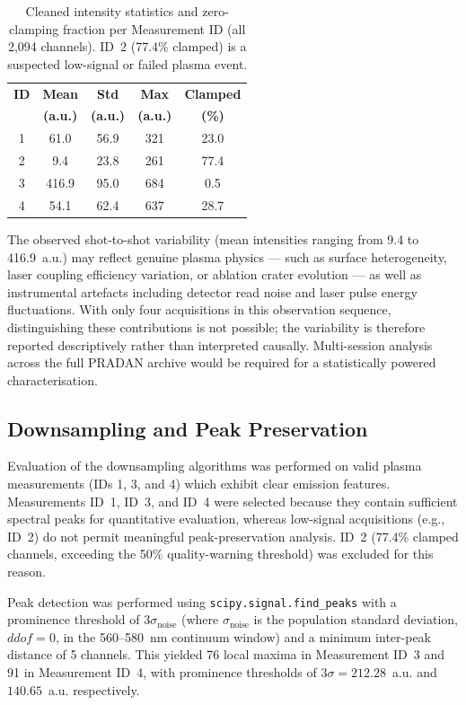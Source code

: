 \documentclass[final,5p,twocolumn,a4paper]{elsarticle}
\begin{document}
\begin{table}[!htbp]
\centering
\footnotesize
\setlength{\tabcolsep}{4pt}
\begin{tabular}{@{}ccccc@{}}
\toprule
\textbf{ID} & \textbf{Mean} & \textbf{Std} & \textbf{Max} & \textbf{Clamped} \\
 & \textbf{(a.u.)} & \textbf{(a.u.)} & \textbf{(a.u.)} & \textbf{(\%)} \\
\midrule
1 & 61.0  & 56.9 & 321 & 23.0 \\
2 & 9.4   & 23.8 & 261 & 77.4 \\
3 & 416.9 & 95.0 & 684 & 0.5  \\
4 & 54.1  & 62.4 & 637 & 28.7 \\
\bottomrule
\end{tabular}
\caption{Cleaned intensity statistics and zero-clamping fraction per Measurement ID (all 2,094 channels). ID~2 (77.4\% clamped) is a suspected low-signal or failed plasma event.}
\label{table:variability}
\end{table}

The observed shot-to-shot variability (mean intensities ranging from 9.4 to 416.9~a.u.) may reflect genuine plasma physics --- such as surface heterogeneity, laser coupling efficiency variation, or ablation crater evolution --- as well as instrumental artefacts including detector read noise and laser pulse energy fluctuations. With only four acquisitions in this observation sequence, distinguishing these contributions is not possible; the variability is therefore reported descriptively rather than interpreted causally. Multi-session analysis across the full PRADAN archive would be required for a statistically powered characterisation.

\subsection{Downsampling and Peak Preservation}

Evaluation of the downsampling algorithms was performed on valid plasma measurements (IDs 1, 3, and 4) which exhibit clear emission features. Measurements ID~1, ID~3, and ID~4 were selected because they contain sufficient spectral peaks for quantitative evaluation, whereas low-signal acquisitions (e.g., ID~2) do not permit meaningful peak-preservation analysis. ID~2 (77.4\% clamped channels, exceeding the 50\% quality-warning threshold) was excluded for this reason.

Peak detection was performed using \texttt{scipy.signal.find\_peaks} with a prominence threshold of $3\sigma_{\text{noise}}$ (where $\sigma_{\text{noise}}$ is the population standard deviation, $\mathit{ddof}{=}0$, in the 560--580~nm continuum window) and a minimum inter-peak distance of 5 channels. This yielded 76 local maxima in Measurement ID~3 and 91 in Measurement ID~4, with prominence thresholds of $3\sigma = 212.28$~a.u. and $140.65$~a.u. respectively.
\end{document}

